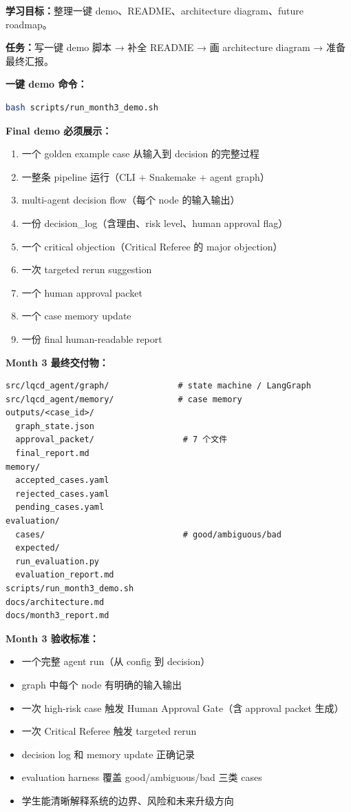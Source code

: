 \documentclass[11pt,a4paper,fontset=fandol]{ctexart}
\begin{document}
\textbf{学习目标：}整理一键 demo、README、architecture diagram、future roadmap。

\textbf{任务：}写一键 demo 脚本 → 补全 README → 画 architecture diagram → 准备最终汇报。

\textbf{一键 demo 命令：}
\begin{lstlisting}[language=bash]
bash scripts/run_month3_demo.sh
\end{lstlisting}

\textbf{Final demo 必须展示：}
\begin{enumerate}
  \item 一个 golden example case 从输入到 decision 的完整过程
  \item 一整条 pipeline 运行（CLI + Snakemake + agent graph）
  \item multi-agent decision flow（每个 node 的输入输出）
  \item 一份 decision\_log（含理由、risk level、human approval flag）
  \item 一个 critical objection（Critical Referee 的 major objection）
  \item 一次 targeted rerun suggestion
  \item 一个 human approval packet
  \item 一个 case memory update
  \item 一份 final human-readable report
\end{enumerate}

\textbf{Month 3 最终交付物：}
\begin{lstlisting}
src/lqcd_agent/graph/              # state machine / LangGraph
src/lqcd_agent/memory/             # case memory
outputs/<case_id>/
  graph_state.json
  approval_packet/                  # 7 个文件
  final_report.md
memory/
  accepted_cases.yaml
  rejected_cases.yaml
  pending_cases.yaml
evaluation/
  cases/                            # good/ambiguous/bad
  expected/
  run_evaluation.py
  evaluation_report.md
scripts/run_month3_demo.sh
docs/architecture.md
docs/month3_report.md
\end{lstlisting}

\textbf{Month 3 验收标准：}
\begin{itemize}
  \item 一个完整 agent run（从 config 到 decision）
  \item graph 中每个 node 有明确的输入输出
  \item 一次 high-risk case 触发 Human Approval Gate（含 approval packet 生成）
  \item 一次 Critical Referee 触发 targeted rerun
  \item decision log 和 memory update 正确记录
  \item evaluation harness 覆盖 good/ambiguous/bad 三类 cases
  \item 学生能清晰解释系统的边界、风险和未来升级方向
\end{itemize}
\end{document}
